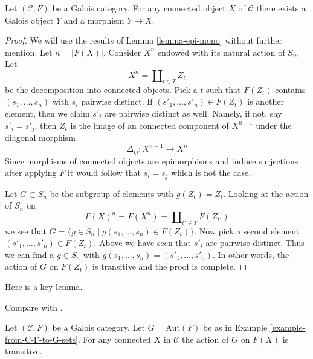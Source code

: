 \begin{lemma}
\label{lemma-galois}
Let $(\mathcal{C}, F)$ be a Galois category. For any connected object $X$
of $\mathcal{C}$ there exists a Galois object $Y$ and a morphism $Y \to X$.
\end{lemma}

\begin{proof}
We will use the results of Lemma \ref{lemma-epi-mono} without further mention.
Let $n = |F(X)|$. Consider $X^n$ endowed with its natural action of
$S_n$. Let
$$
X^n = \coprod\nolimits_{t \in T} Z_t
$$
be the decomposition into connected objects. Pick a $t$ such that
$F(Z_t)$ contains $(s_1, \ldots, s_n)$ with $s_i$ pairwise distinct.
If $(s'_1, \ldots, s'_n) \in F(Z_t)$ is another element, then we
claim $s'_i$ are pairwise distinct as well. Namely, if not, say
$s'_i = s'_j$, then $Z_t$ is the image of an connected component of
$X^{n - 1}$ under the diagonal morphism
$$
\Delta_{ij} : X^{n - 1} \longrightarrow X^n
$$
Since morphisms of connected objects are epimorphisms and induce
surjections after applying $F$ it would follow that $s_i = s_j$
which is not the case.

\medskip\noindent
Let $G \subset S_n$ be the subgroup of elements with $g(Z_t) = Z_t$.
Looking at the action of $S_n$ on
$$
F(X)^n = F(X^n) = \coprod\nolimits_{t' \in T} F(Z_{t'})
$$
we see that $G = \{g \in S_n \mid g(s_1, \ldots, s_n) \in F(Z_t)\}$.
Now pick a second element $(s'_1, \ldots, s'_n) \in F(Z_t)$.
Above we have seen that $s'_i$ are pairwise distinct. Thus we can
find a $g \in S_n$ with $g(s_1, \ldots, s_n) = (s'_1, \ldots, s'_n)$.
In other words, the action of $G$ on $F(Z_t)$ is transitive and
the proof is complete.
\end{proof}

\noindent
Here is a key lemma.

\begin{lemma}
\label{lemma-tame}
\begin{reference}
Compare with \cite[Definition 7.2.4]{BS}.
\end{reference}
Let $(\mathcal{C}, F)$ be a Galois category. Let $G = \text{Aut}(F)$
be as in Example \ref{example-from-C-F-to-G-sets}. For any connected
$X$ in $\mathcal{C}$ the action of $G$ on $F(X)$ is transitive.
\end{lemma}

